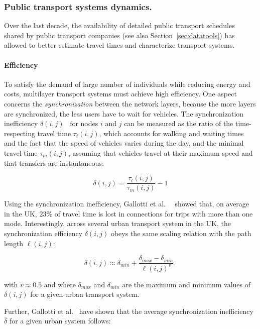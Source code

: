 \subsubsection{Public transport systems dynamics.} 
Over the last decade, the availability of detailed public transport schedules shared by public transport companies (see also Section~\ref{sec:datatools}) has allowed to better estimate travel times and characterize transport systems. 

\paragraph{Efficiency} 
To satisfy the demand of large number of individuals while reducing energy and costs, multilayer transport systems must achieve high efficiency. One aspect concerns the \emph{synchronization} between the network layers, because the more layers are synchronized, the less users have to wait for vehicles. The synchronization inefficiency $\delta(i,j)$~\cite{Gallotti2014Efficiency,barthelemy2016structure} for nodes $i$ and $j$ can be measured as the ratio of the time-respecting travel time $\tau_t(i,j)$, which accounts for walking and waiting times and the fact that the speed of vehicles varies during the day, and the minimal travel time $\tau_m(i,j)$, assuming that vehicles travel at their maximum speed and that transfers are instantaneous:

\begin{equation}
    \delta(i,j)=\frac{\tau_t(i,j)}{\tau_m(i,j)}-1
\end{equation}

Using the synchronization inefficiency, Gallotti et al.~~\cite{Gallotti2014Efficiency} showed that, on average in the UK, $23\%$ of travel time is lost in connections for trips with more than one mode. Interestingly, across several urban transport system in the UK, the synchronization efficiency $\delta(i,j)$ obeys the same scaling relation with the path length $\ell(i,j)$:

\begin{equation} \label{eq:deltaSynchronization}
    \delta(i,j) \approx \delta_{\textit{min}}+\frac{\delta_{\textit{max}}-\delta_{\textit{min}}}{\ell(i,j)^v},
\end{equation}

with $v \approx 0.5$ and where $\delta_{\textit{max}}$ and $\delta_{\textit{min}}$ are the maximum and minimum values of $\delta(i,j)$ for a given urban transport system.

Further, Gallotti et al.~\cite{Gallotti2014Efficiency} have shown that the average synchronization inefficiency $\overline{\delta}$ for a given urban system follows: 

